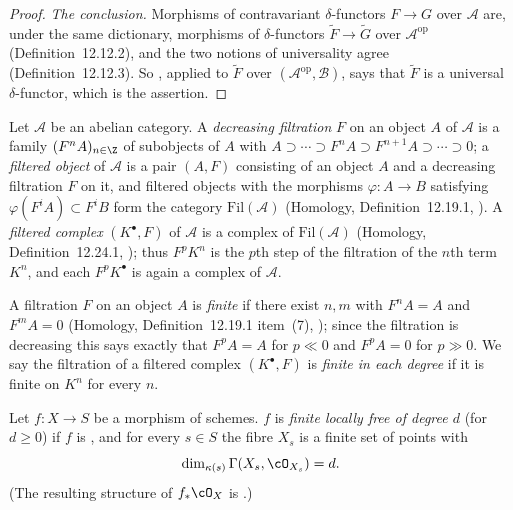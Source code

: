 \begin{proof}
\emph{The conclusion.}  Morphisms of contravariant
$\delta$-functors $F\to G$ over $\mathcal A$ are, under the same
dictionary, morphisms of $\delta$-functors
$\widetilde F\to\widetilde G$ over $\mathcal A^{\mathrm{op}}$
(Definition~12.12.2), and the two notions of universality agree
(Definition~12.12.3).  So
, applied to $\widetilde F$ over
$(\mathcal A^{\mathrm{op}},\mathcal B)$, says that $\widetilde F$ is
a universal $\delta$-functor, which is the assertion.
\end{proof}

\begin{definition}
\label{def:pc-filtered-complex}
Let $\mathcal A$ be an abelian category.  A \emph{decreasing filtration} $F$
on an object $A$ of $\mathcal A$ is a family $(F^nA)_{n\in\Z}$ of subobjects
of $A$ with
$A\supset\cdots\supset F^nA\supset F^{n+1}A\supset\cdots\supset0$; a
\emph{filtered object} of $\mathcal A$ is a pair $(A,F)$ consisting of an
object $A$ and a decreasing filtration $F$ on it, and filtered objects with
the morphisms $\varphi:A\to B$ satisfying $\varphi(F^iA)\subset F^iB$ form
the category $\mathrm{Fil}(\mathcal A)$ (Homology, Definition~12.19.1,
).  A \emph{filtered complex} $(K^\bullet,F)$ of
$\mathcal A$ is a complex of $\mathrm{Fil}(\mathcal A)$ (Homology,
Definition~12.24.1,
); thus $F^pK^n$ is the
$p$th step of the filtration of the $n$th term $K^n$, and each
$F^pK^\bullet$ is again a complex of $\mathcal A$.

A filtration $F$ on an object $A$ is \emph{finite} if there exist $n,m$ with
$F^nA=A$ and $F^mA=0$ (Homology, Definition~12.19.1 item~(7),
); since the filtration
is decreasing this says exactly that $F^pA=A$ for $p\ll0$ and $F^pA=0$ for
$p\gg0$.  We say the filtration of a filtered complex $(K^\bullet,F)$ is
\emph{finite in each degree} if it is finite on $K^n$ for every $n$.
\end{definition}

\begin{definition}
\label{def:pc-finite-locally-free}
Let $f:X\to S$ be a morphism of schemes.  $f$ is \emph{finite locally
free of degree $d$} (for $d\geq0$) if $f$ is
, and for every $s\in S$ the fibre $X_s$ is a finite
set of points with
\[
\dim_{\kappa(s)}\Gamma(X_s,\cO_{X_s})=d .
\]
(The resulting structure of $f_*\cO_X$ is .)
\end{definition}

